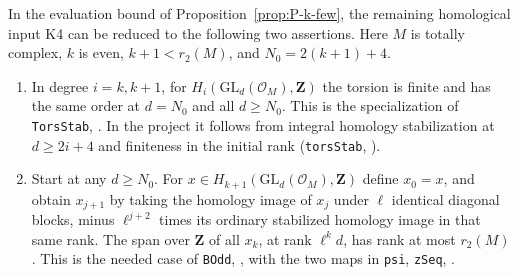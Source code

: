 \begin{proposition}
\label{prop:P-k-bock}
In the evaluation bound of Proposition~\ref{prop:P-k-few}, the remaining
homological input K4 can be reduced to the following two assertions.
Here $M$ is totally complex, $k$ is even, $k+1<r_2(M)$, and
$N_0=2(k+1)+4$.
\begin{enumerate}
\item In degree $i=k,k+1$, for $H_i(\mathrm{GL}_d(\mathcal O_M),\mathbf Z)$
the torsion is finite and has the same order at $d=N_0$ and all $d\ge N_0$.
This is the specialization of \nolinkurl{TorsStab},
. In the project it follows
from integral homology stabilization at $d\ge 2i+4$ and finiteness in the
initial rank (\nolinkurl{torsStab}, ).
\item Start at any $d\ge N_0$. For $x\in H_{k+1}(\mathrm{GL}_d(\mathcal O_M),\mathbf Z)$
define $x_0=x$, and obtain $x_{j+1}$ by taking the homology image of $x_j$
under $\ell$ identical diagonal blocks, minus $\ell^{j+2}$ times its
ordinary stabilized homology image in that same rank. The span over
$\mathbf Z$ of all $x_k$, at rank $\ell^k d$, has rank at most $r_2(M)$.
This is the needed case of \nolinkurl{BOdd},
, with the two maps in
\nolinkurl{psi}, \nolinkurl{zSeq}, .
\end{enumerate}
\end{proposition}
